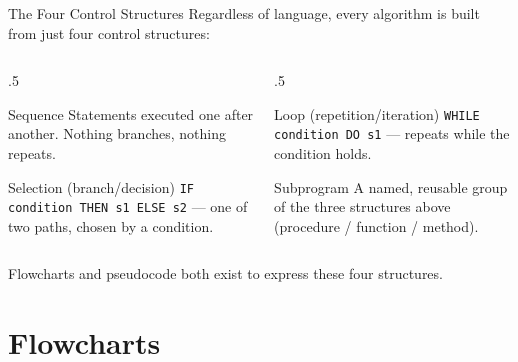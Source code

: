 \documentclass[9pt,aspectratio=169,xcolor=table]{beamer}
\begin{document}
\begin{frame}{The Four Control Structures}
    \leavevmode
    \small
    Regardless of language, every algorithm is built from just four
    control structures:

    \vspace{2mm}
    \begin{columns}[t]
        \begin{column}{.5\textwidth}
            \begin{block}{Sequence}
                \scriptsize Statements executed one after another.
                Nothing branches, nothing repeats.
            \end{block}
            \vspace{2mm}
            \begin{block}{Selection (branch/decision)}
                \scriptsize \texttt{IF condition THEN s1 ELSE s2} ---
                one of two paths, chosen by a condition.
            \end{block}
        \end{column}
        \begin{column}{.5\textwidth}
            \begin{block}{Loop (repetition/iteration)}
                \scriptsize \texttt{WHILE condition DO s1} --- repeats
                while the condition holds.
            \end{block}
            \vspace{2mm}
            \begin{block}{Subprogram}
                \scriptsize A named, reusable group of the three
                structures above (procedure / function / method).
            \end{block}
        \end{column}
    \end{columns}

    \vspace{3mm}
    {\scriptsize Flowcharts and pseudocode both exist to express these
    four structures.}
\end{frame}

\section{Flowcharts}
\end{document}
